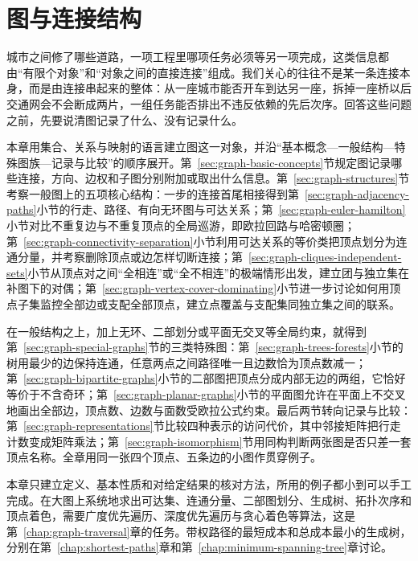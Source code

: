 \chapter{图与连接结构}
\label{chap:graph-objects}
\label{chap:graph-paths}

城市之间修了哪些道路，一项工程里哪项任务必须等另一项完成，这类信息都由“有限个对象”和“对象之间的直接连接”组成。我们关心的往往不是某一条连接本身，而是由连接串起来的整体：从一座城市能否开车到达另一座，拆掉一座桥以后交通网会不会断成两片，一组任务能否排出不违反依赖的先后次序。回答这些问题之前，先要说清图记录了什么、没有记录什么。

本章用集合、关系与映射的语言建立图这一对象，并沿“基本概念—一般结构—特殊图族—记录与比较”的顺序展开。第~\ref{sec:graph-basic-concepts}节规定图记录哪些连接，方向、边权和子图分别附加或取出什么信息。第~\ref{sec:graph-structures}节考察一般图上的五项核心结构：一步的连接首尾相接得到第~\ref{sec:graph-adjacency-paths}小节的行走、路径、有向无环图与可达关系；第~\ref{sec:graph-euler-hamilton}小节对比不重复边与不重复顶点的全局巡游，即欧拉回路与哈密顿圈；第~\ref{sec:graph-connectivity-separation}小节利用可达关系的等价类把顶点划分为连通分量，并考察删除顶点或边怎样切断连接；第~\ref{sec:graph-cliques-independent-sets}小节从顶点对之间“全相连”或“全不相连”的极端情形出发，建立团与独立集在补图下的对偶；第~\ref{sec:graph-vertex-cover-dominating}小节进一步讨论如何用顶点子集监控全部边或支配全部顶点，建立点覆盖与支配集同独立集之间的联系。

在一般结构之上，加上无环、二部划分或平面无交叉等全局约束，就得到第~\ref{sec:graph-special-graphs}节的三类特殊图：第~\ref{sec:graph-trees-forests}小节的树用最少的边保持连通，任意两点之间路径唯一且边数恰为顶点数减一；第~\ref{sec:graph-bipartite-graphs}小节的二部图把顶点分成内部无边的两组，它恰好等价于不含奇环；第~\ref{sec:graph-planar-graphs}小节的平面图允许在平面上不交叉地画出全部边，顶点数、边数与面数受欧拉公式约束。最后两节转向记录与比较：第~\ref{sec:graph-representations}节比较四种表示的访问代价，其中邻接矩阵把行走计数变成矩阵乘法；第~\ref{sec:graph-isomorphism}节用同构判断两张图是否只差一套顶点名称。全章用同一张四个顶点、五条边的小图作贯穿例子。

本章只建立定义、基本性质和对给定结果的核对方法，所用的例子都小到可以手工完成。在大图上系统地求出可达集、连通分量、二部图划分、生成树、拓扑次序和顶点着色，需要广度优先遍历、深度优先遍历与贪心着色等算法，这是第~\ref{chap:graph-traversal}章的任务。带权路径的最短成本和总成本最小的生成树，分别在第~\ref{chap:shortest-paths}章和第~\ref{chap:minimum-spanning-tree}章讨论。








